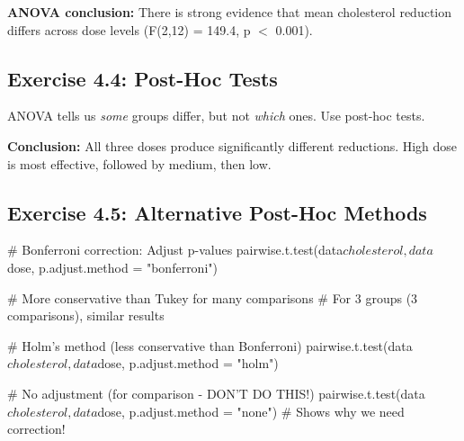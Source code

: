 \documentclass[11pt]{article}
\begin{document}
\textbf{ANOVA conclusion:} There is strong evidence that mean cholesterol reduction differs across dose levels (F(2,12) = 149.4, p $<$ 0.001).

\vspace{1cm}

\subsection{Exercise 4.4: Post-Hoc Tests}

ANOVA tells us \textit{some} groups differ, but not \textit{which} ones. Use post-hoc tests.


\textbf{Conclusion:} All three doses produce significantly different reductions. High dose is most effective, followed by medium, then low.

\vspace{1cm}

\subsection{Exercise 4.5: Alternative Post-Hoc Methods}

\begin{rcode}
# Bonferroni correction: Adjust p-values
pairwise.t.test(data$cholesterol, data$dose,
                p.adjust.method = "bonferroni")

# More conservative than Tukey for many comparisons
# For 3 groups (3 comparisons), similar results

# Holm's method (less conservative than Bonferroni)
pairwise.t.test(data$cholesterol, data$dose,
                p.adjust.method = "holm")

# No adjustment (for comparison - DON'T DO THIS!)
pairwise.t.test(data$cholesterol, data$dose,
                p.adjust.method = "none")
# Shows why we need correction!
\end{rcode}
\end{document}
